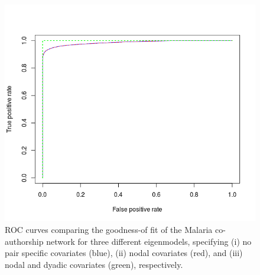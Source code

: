 \begin{figure}[!h]
\centering
\includegraphics[scale=0.75]{Chapters/malaria/statMod/lnm_ROC.png}
\caption{ROC curves comparing the goodness-of fit of the Malaria co-authorship network for three different eigenmodels, specifying (i) no pair specific covariates (blue), (ii) nodal covariates (red), and (iii) nodal and dyadic covariates (green), respectively.}
\label{fig:malaria_lnm_roc}
\end{figure}
~\\
\pagebreak
